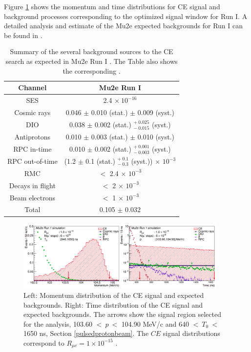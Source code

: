 Figure \ref{fig:sensitivity} shows the momentum and time distributions 
for CE signal and background processes corresponding to the optimized 
signal window for Run I. A detailed analysis and  estimate of the Mu2e 
expected backgrounds for Run I can be found in \cite{universe9010054}.
\begin{center}  
\begin{table}[!h]
\centering
\renewcommand{\arraystretch}{1.2}
\begin{tabular}{| c | c |}
\hline
\textbf{Channel} & \textbf{Mu2e Run I}\\
\hline
SES & 2.4 $\times \ 10^{-16}$ \\
\hline
Cosmic rays & 0.046 $\pm$ 0.010 (stat.) $\pm$ 0.009 (syst.) \\
DIO & 0.038 $\pm$ 0.002 (stat.) $ ^{+ \ 0.025} _{- \ 0.015}$ (syst.)\\
Antiprotons & 0.010 $\pm$ 0.003 (stat.) $\pm$ 0.010 (syst.) \\
RPC in-time & 0.010 $\pm$ 0.002 (stat.) $ ^{+ \ 0.001} _{- \ 0.003}$ (syst.)\\
RPC out-of-time & (1.2 $\pm$ 0.1  (stat.) $ ^{+ \ 0.1} _{- \ 0.3}$ (syst.)) $\times$ $10^{-3}$ \\
RMC & $<$ 2.4 $\times$ $10^{-3}$ \\
Decays in flight & $<$ 2 $\times$ $10^{-3}$ \\
Beam electrons & $<$ 1 $\times$ $10^{-3}$ \\
\hline
Total &  0.105 $\pm$ 0.032\\
\hline
\end{tabular}
\caption{Summary of the several background sources to 
the CE search as expected in Mu2e Run I \cite{universe9010054}. 
The Table also shows the corresponding . 
}

\label{tab:summarybkg}
\end{table}
\end{center}
\begin{figure}[!h]
\centering
\includegraphics[width =0.93\textwidth]{figures/png/Screenshot_20240225_102708.png}
\caption[Mu2e simulated signal.]{Left: Momentum distribution of the CE signal and expected backgrounds. Right: Time distribution of the CE signal and expected backgrounds. The arrows show the signal region selected for the analysis, 103.60 $< \ p \ < $ 104.90 MeV/c and 640 $< \ T_0 \ < $ 1650 ns, Section \ref{pulsedprotonbeam}. The $CE$ signal distributions correspond to $R_{\mu e} = 1 \times 10^{-15}$ \cite{universe9010054}.}
\label{fig:sensitivity}
\end{figure}
